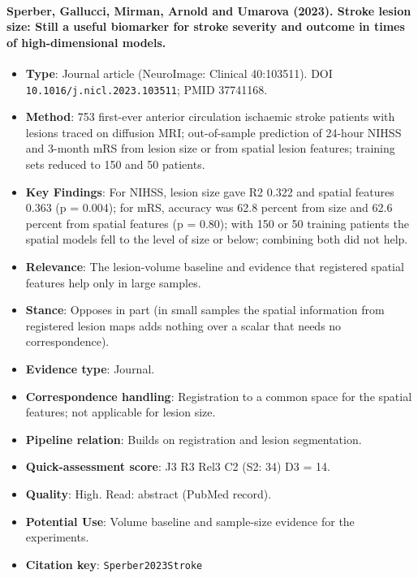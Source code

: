 \documentclass[journal,onecolumn]{IEEEtran}
\begin{document}
\paragraph{Sperber, Gallucci, Mirman, Arnold and Umarova (2023). Stroke lesion size: Still a useful biomarker for stroke severity and outcome in times of high-dimensional models.~\cite{Sperber2023Stroke}}\mbox{}

\begin{itemize}

\item{} \textbf{Type}: Journal article (NeuroImage: Clinical 40:103511). DOI \nolinkurl{10.1016/j.nicl.2023.103511}; PMID 37741168.

\item{} \textbf{Method}: 753 first-ever anterior circulation ischaemic stroke patients with lesions traced on diffusion MRI; out-of-sample prediction of 24-hour NIHSS and 3-month mRS from lesion size or from spatial lesion features; training sets reduced to 150 and 50 patients.

\item{} \textbf{Key Findings}: For NIHSS, lesion size gave R2 0.322 and spatial features 0.363 (p = 0.004); for mRS, accuracy was 62.8 percent from size and 62.6 percent from spatial features (p = 0.80); with 150 or 50 training patients the spatial models fell to the level of size or below; combining both did not help.

\item{} \textbf{Relevance}: The lesion-volume baseline and evidence that registered spatial features help only in large samples.

\item{} \textbf{Stance}: Opposes in part (in small samples the spatial information from registered lesion maps adds nothing over a scalar that needs no correspondence).

\item{} \textbf{Evidence type}: Journal.

\item{} \textbf{Correspondence handling}: Registration to a common space for the spatial features; not applicable for lesion size.

\item{} \textbf{Pipeline relation}: Builds on registration and lesion segmentation.

\item{} \textbf{Quick-assessment score}: J3 R3 Rel3 C2 (S2: 34) D3 = 14.

\item{} \textbf{Quality}: High. Read: abstract (PubMed record).

\item{} \textbf{Potential Use}: Volume baseline and sample-size evidence for the experiments.

\item{} \textbf{Citation key}: \texttt{Sperber2023Stroke}

\end{itemize}
\end{document}
